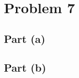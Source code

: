 \documentclass[11pt]{article}
\begin{document}

\section{Problem 7}


\subsection{Part (a)}


\subsection{Part (b)}

\end{document}
